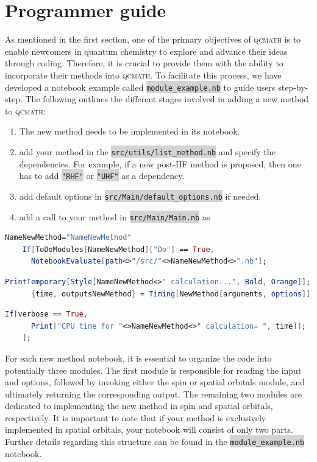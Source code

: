 \documentclass[aip,jcp,reprint,noshowkeys,superscriptaddress]{revtex4-1}
\newcommand{\qcmath}{\textsc{qcmath}\xspace}
\newcommand{\keyword}[1]{{\colorbox{lightgray}{\texttt{#1}}}}
\begin{document}
\section{Programmer guide}
As mentioned in the first section, one of the primary objectives of \qcmath is to enable newcomers in quantum chemistry to explore and advance their ideas through coding. Therefore, it is crucial to provide them with the ability to incorporate their methods into \qcmath. To facilitate this process, we have developed a notebook example called \keyword{module\_example.nb} to guide users step-by-step. The following outlines the different stages involved in adding a new method to \qcmath:
\begin{enumerate}
	\item The new method needs to be implemented in its notebook.
	\item add your method in the \keyword{src/utils/list\_method.nb} and specify the dependencies. For example, if a new post-HF method is proposed, then one has to add \keyword{"RHF"} or \keyword{"UHF"} as a dependency.
	\item add default options in \keyword{src/Main/default\_options.nb} if needed.
	\item add a call to your method in \keyword{src/Main/Main.nb} as
\end{enumerate}
\begin{lstlisting}[extendedchars=true,language=Mathematica]
	NameNewMethod="NameNewMethod"
	If[ToDoModules[NameNewMethod]["Do"] == True,
	  NotebookEvaluate[path<>"/src/"<>NameNewMethod<>".nb"];
\end{lstlisting}
\begin{lstlisting}[extendedchars=true,language=Mathematica]
	PrintTemporary[Style[NameNewMethod<>" calculation...", Bold, Orange]];
	  {time, outputsNewMethod} = Timing[NewMethod[arguments, options]];	
\end{lstlisting}
\begin{lstlisting}[extendedchars=true,language=Mathematica]
	If[verbose == True, 
	  Print["CPU time for "<>NameNewMethod<>" calculation= ", time]];
	];
\end{lstlisting}
For each new method notebook, it is essential to organize the code into potentially three modules. The first module is responsible for reading the input and options, followed by invoking either the spin or spatial orbitals module, and ultimately returning the corresponding output. The remaining two modules are dedicated to implementing the new method in spin and spatial orbitals, respectively. It is important to note that if your method is exclusively implemented in spatial orbitals, your notebook will consist of only two parts. Further details regarding this structure can be found in the \keyword{module\_example.nb} notebook.
\end{document}
